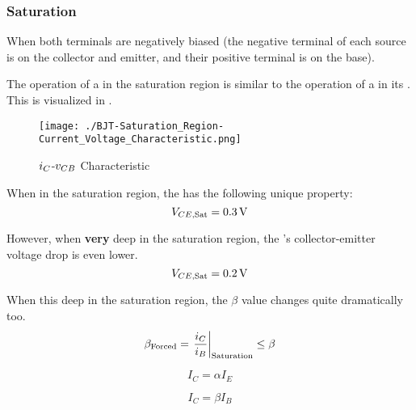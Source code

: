 \subsubsection{Saturation}\label{subsubsec:BJT_Saturation_Region}
When both terminals are negatively biased (the negative terminal of each source is on the collector and emitter, and their positive terminal is on the base).

\begin{remark*}
  The operation of a  in the saturation region is similar to the operation of a  in its .
  This is visualized in .
\end{remark*}

\begin{figure}[h!tbp]
  \centering
  \texttt{[image: ./BJT-Saturation\_Region-Current\_Voltage\_Characteristic.png]}
  \caption{$i_{C}$-$v_{CB}$ Characteristic \parencite[p.~317]{sedraTextbook7}}
  \label{fig:BJT-Saturation_Region-Current_Voltage_Characteristic}
\end{figure}

When in the saturation region, the  has the following unique property:
\begin{equation}\label{eq:BJT_Collector_Emitter_Saturation_Voltage}
  V_{CE, \mathrm{Sat}} = \SI{0.3}{\volt}
\end{equation}

However, when \textbf{very} deep in the saturation region, the 's collector-emitter voltage drop is even lower.
\begin{equation}\label{eq:BJT_Collector_Emitter_Deep_Saturation_Voltage}
  V_{CE, \mathrm{Sat}} = \SI{0.2}{\volt}
\end{equation}

When this deep in the saturation region, the $\beta$ value changes quite dramatically too.
\begin{equation}\label{eq:BJT-Beta_Forced}
  \beta_{\text{Forced}} = \left. \frac{i_{C}}{i_{B}} \right\rvert_{\text{Saturation}} \leq \beta
\end{equation}

\begin{equation}\label{eq:BJT_Alpha}
  I_{C} = \alpha I_{E}
\end{equation}


\begin{equation}\label{eq:BJT_Beta}
  I_{C} = \beta I_{B}
\end{equation}


